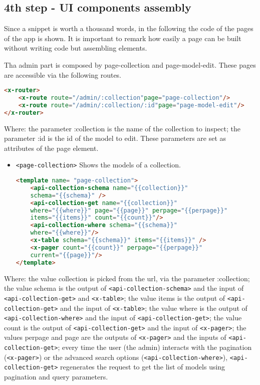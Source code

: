 \subsection{4th step - UI components assembly}

Since a snippet is worth a thousand words, in the following the code of the pages of the app is shown. It is important to remark how easily a page can be built without writing code but assembling elements.

Tha admin part is composed by page-collection and page-model-edit. These pages are accessible via the following routes.

\begin{lstlisting}[language=html]
<x-router>
	<x-route route="/admin/:collection"page="page-collection"/>
	<x-route route="/admin/:collection/:id"page="page-model-edit"/>
</x-router>
\end{lstlisting}

Where: the parameter :collection is the name of the collection to inspect; the parameter :id is the id of the model to edit. These parameters are set as attributes of the page element.

\begin{itemize} \item \texttt{<page-collection>} Shows the models of a collection.
\begin{lstlisting}[language=html]
<template name= "page-collection">
	<api-collection-schema name="{{collection}}" 
	schema="{{schema}" />
	<api-collection-get name="{{collection}}" 
	where="{{where}}" page="{{page}}" perpage="{{perpage}}"
	items="{{items}}" count="{{count}}"/>
	<api-collection-where schema="{{schema}}" 
	where="{{where}}"/>
	<x-table schema="{{schema}}" items="{{items}}" />
	<x-pager count="{{count}}" perpage="{{perpage}}" 
	current="{{page}}"/>
</template>
\end{lstlisting}
\end{itemize}

Where: the value collection is picked from the url, via the parameter :collection; the value schema is the output of \texttt{<api-collection-schema>} and the input of \texttt{<api-collection-get>} and \texttt{<x-table>}; the value items is the output of \texttt{<api-collection-get>} and the input of \texttt{<x-table>}; the value where is the output of \texttt{<api-collection-where>} and the input of \texttt{<api-collection-get>}; the value count is the output of \texttt{<api-collection-get>} and the input of \texttt{<x-pager>}; the values perpage and page are the outputs of \texttt{<x-pager>} and the inputs of \texttt{<api-collection-get>}; every time the user (the admin) interacts with the pagination (\texttt{<x-pager>}) or the advanced search options (\texttt{<api-collection-where>}), \texttt{<api-collection-get>} regenerates the request to get the list of models using pagination and query parameters.


